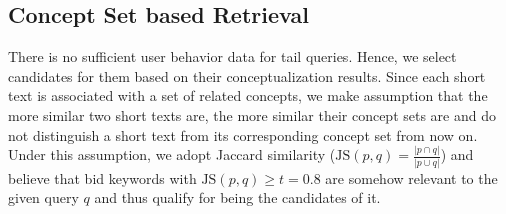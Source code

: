 \subsection{Concept Set based Retrieval}
\label{sec:CSJS}
There is no sufficient user behavior data for tail queries. Hence, we
select candidates for them based on their conceptualization results.
Since each short text is associated with a set of related concepts,
      we make assumption that the more similar two short texts are,
      the more similar their concept sets are and do not distinguish a
      short text from its corresponding concept set from now on. Under
      this assumption, we adopt Jaccard similarity ($\text{JS}(p,q)=\frac{\vert{}p\cap{}q\vert{}}{\vert{}p\cup{}q\vert{}}$)
    and believe that bid keywords with $\text{JS}(p,q)\geq{}t=0.8$ are
    somehow relevant to the given query $q$ and thus 
qualify for being the candidates of it.


